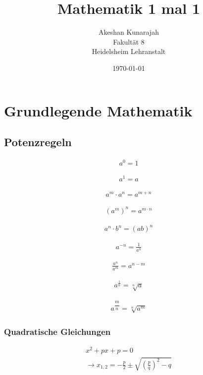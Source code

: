 \documentclass{article}
\title{Mathematik 1 mal 1}
\author{Akeshan Kunarajah \\ Fakultät 8 \\
Heidelsheim Lehranstalt}
\date{\today}
\begin{document}
\maketitle
\tableofcontents
\thispagestyle{empty}


\newpage
\setcounter{page}{1}
\section{Grundlegende Mathematik}
\subsection{Potenzregeln}

\begin{align}
a^{0}=1
\end{align}

\begin{align}
a^{1}=a
\end{align}

\begin{align}
a^{m} \cdot a^{n} = a^{m+n}
\end{align}

\begin{align}
(a^{m})^{n} = a^{m \cdot n}
\end{align}

\begin{align}
a^{n} \cdot b^{n} = (ab)^{n}
\end{align}

\begin{align}
a^{-n} = \frac{1}{a^{n}}
\end{align}

\begin{align}
\frac{a^{n}}{a^{m}} = a^{n-m}
\end{align}

\begin{align}
a^{\frac{1}{n}} = \sqrt[n]{a}
\end{align}

\begin{align}
a^{\dfrac{m}{n}} = \sqrt[n]{a^{m}}
\end{align}

\subsubsection{Quadratische Gleichungen}
\begin{align}
x^{2} + px + p = 0
\\
\longrightarrow x_{1,2} = -\frac{p}{2} \pm \sqrt{(\frac{p}{q})^{2} - q}
\end{align}
\end{document}
